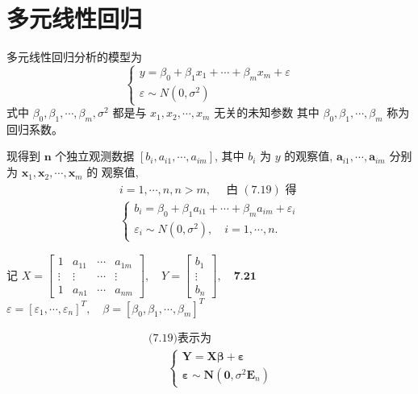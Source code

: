 \section{多元线性回归}

多元线性回归分析的模型为
$$
\left\{\begin{array}{l}
y=\beta_{0}+\beta_{1} x_{1}+\cdots+\beta_{m} x_{m}+\varepsilon \\
\varepsilon \sim N\left(0, \sigma^{2}\right)
\end{array}\right.
$$
式中 \( \beta_{0}, \beta_{1}, \cdots, \beta_{m}, \sigma^{2} \) 都是与 \( x_{1}, x_{2}, \cdots, x_{m} \) 无关的未知参数
其中 \( \beta_{0}, \beta_{1}, \cdots, \beta_{m} \) 称为回归系数。

现得到 \( \boldsymbol{n} \) 个独立观测数据 \( \left[b_{i}, a_{i 1}, \cdots, a_{i m}\right] \), 其中 \( b_{i} \) 为 \( y \) 的观察值, \( \boldsymbol{a}_{i 1}, \cdots, \boldsymbol{a}_{i m} \) 分别为 \( \boldsymbol{x}_{1}, \boldsymbol{x}_{2}, \cdots, \boldsymbol{x}_{m} \) 的 观察值,
$$
\begin{aligned}
i=1, \cdots, n, n>m, \quad \text { 甴 }(7.19) \text { 得 } \\
\left\{\begin{array}{l}
b_{i}=\beta_{0}+\beta_{1} a_{i 1}+\cdots+\beta_{m} a_{i m}+\varepsilon_{i} \\
\varepsilon_{i} \sim N\left(0, \sigma^{2}\right), \quad i=1, \cdots, n .
\end{array}\right.
\end{aligned}
$$

记 \( X=\left[\begin{array}{cccc}1 & a_{11} & \cdots & a_{1 m} \\ \vdots & \vdots & \cdots & \vdots \\ 1 & a_{n 1} & \cdots & a_{n m}\end{array}\right], \quad Y=\left[\begin{array}{c}b_{1} \\ \vdots \\ b_{n}\end{array}\right], \quad \mathbf{7 . 2 1} \)
\( \varepsilon=\left[\varepsilon_{1}, \cdots, \varepsilon_{n}\right]^{T}, \quad \beta=\left[\beta_{0}, \beta_{1}, \cdots, \beta_{m}\right]^{T} \)

$$
\begin{array}{l}
\text { (7.19)表示为 } \\
\qquad\left\{\begin{array}{l}
\boldsymbol{Y}=\boldsymbol{X} \boldsymbol{\beta}+\boldsymbol{\varepsilon} \\
\boldsymbol{\varepsilon} \sim \boldsymbol{N}\left(\mathbf{0}, \sigma^{2} \boldsymbol{E}_{n}\right)
\end{array}\right.
\end{array}
$$

